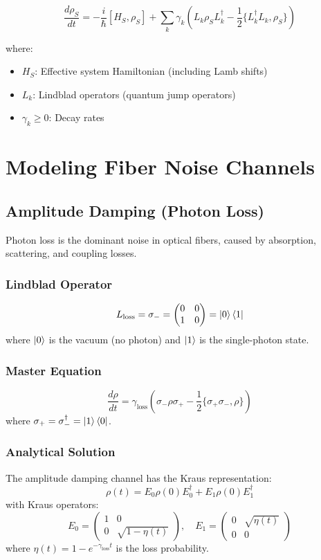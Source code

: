 \documentclass[12pt]{article}
\begin{document}
\begin{equation}
\boxed{\frac{d\rho_S}{dt} = -\frac{i}{\hbar}[H_S, \rho_S] + \sum_k \gamma_k \left( L_k \rho_S L_k^\dagger - \frac{1}{2}\{L_k^\dagger L_k, \rho_S\} \right)}
\label{eq:lindblad}
\end{equation}

where:
\begin{itemize}
    \item $H_S$: Effective system Hamiltonian (including Lamb shifts)
    \item $L_k$: Lindblad operators (quantum jump operators)
    \item $\gamma_k \geq 0$: Decay rates
\end{itemize}

\section{Modeling Fiber Noise Channels}

\subsection{Amplitude Damping (Photon Loss)}
Photon loss is the dominant noise in optical fibers, caused by absorption, scattering, and coupling losses.

\subsubsection{Lindblad Operator}
\[
L_{\text{loss}} = \sigma_- = \begin{pmatrix} 0 & 0 \\ 1 & 0 \end{pmatrix} = \ket{0}\bra{1}
\]
where $\ket{0}$ is the vacuum (no photon) and $\ket{1}$ is the single-photon state.

\subsubsection{Master Equation}
\begin{equation}
\frac{d\rho}{dt} = \gamma_{\text{loss}} \left( \sigma_- \rho \sigma_+ - \frac{1}{2}\{\sigma_+\sigma_-, \rho\} \right)
\label{eq:amp_damp}
\end{equation}
where $\sigma_+ = \sigma_-^\dagger = \ket{1}\bra{0}$.

\subsubsection{Analytical Solution}
The amplitude damping channel has the Kraus representation:
\[
\rho(t) = E_0 \rho(0) E_0^\dagger + E_1 \rho(0) E_1^\dagger
\]
with Kraus operators:
\[
E_0 = \begin{pmatrix} 1 & 0 \\ 0 & \sqrt{1-\eta(t)} \end{pmatrix}, \quad
E_1 = \begin{pmatrix} 0 & \sqrt{\eta(t)} \\ 0 & 0 \end{pmatrix}
\]
where $\eta(t) = 1 - e^{-\gamma_{\text{loss}} t}$ is the loss probability.
\end{document}
